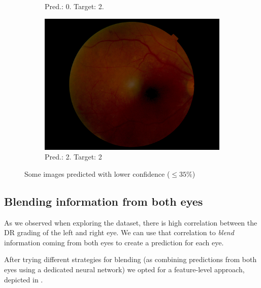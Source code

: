 \begin{figure}[tb]
\begin{subfigure}[b]{0.32\textwidth}
         \caption{Pred.: 0. Target: 2.}
     \end{subfigure}
     \hfill
    \begin{subfigure}[b]{0.32\textwidth}
         \centering
         \includegraphics[height=\textwidth,width=\textwidth]{figures/chapter5/unconfident/35800_right.jpeg}
         \caption{Pred.: 2. Target: 2}
        \label{fig:unconfident3}
     \end{subfigure}
    \caption{Some images predicted with lower confidence (\( \leq 35\%\)) }
    \label{fig:unconfident}
\end{figure}

\subsection{Blending information from both eyes} \label{sec:blending} 
As we observed when exploring the dataset, there is high correlation between the DR grading of the left and right eye. We can use that correlation to \textit{blend} information coming from both eyes to create a prediction for each eye.

After trying different strategies for blending (as combining predictions from both eyes using a dedicated neural network) we opted for a feature-level approach, depicted in .

